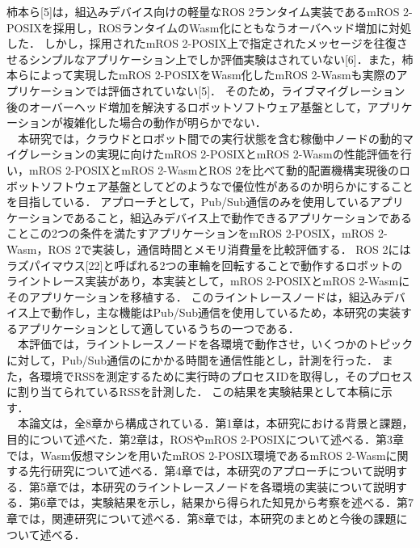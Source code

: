 柿本ら[5]は，組込みデバイス向けの軽量なROS 2ランタイム実装であるmROS 2-POSIXを採用し，ROSランタイムのWasm化にともなうオーバヘッド増加に対処した．
しかし，採用されたmROS 2-POSIX上で指定されたメッセージを往復させるシンプルなアプリケーション上でしか評価実験はされていない[6]．また，柿本らによって実現したmROS 2-POSIXをWasm化したmROS 2-Wasmも実際のアプリケーションでは評価されていない[5]．
そのため，ライブマイグレーション後のオーバーヘッド増加を解決するロボットソフトウェア基盤として，アプリケーションが複雑化した場合の動作が明らかでない．
\\　本研究では，クラウドとロボット間での実行状態を含む稼働中ノードの動的マイグレーションの実現に向けたmROS 2-POSIXとmROS 2-Wasmの性能評価を行い，mROS 2-POSIXとmROS 2-WasmとROS 2を比べて動的配置機構実現後のロボットソフトウェア基盤としてどのようなで優位性があるのか明らかにすることを目指している．
アプローチとして，Pub/Sub通信のみを使用しているアプリケーションであること，組込みデバイス上で動作できるアプリケーションであることこの2つの条件を満たすアプリケーションをmROS 2-POSIX，mROS 2-Wasm，ROS 2で実装し，通信時間とメモリ消費量を比較評価する．
ROS 2にはラズパイマウス[22]と呼ばれる2つの車輪を回転することで動作するロボットのライントレース実装があり，本実装として，mROS 2-POSIXとmROS 2-Wasmにそのアプリケーションを移植する．
このライントレースノードは，組込みデバイス上で動作し，主な機能はPub/Sub通信を使用しているため，本研究の実装するアプリケーションとして適しているうちの一つである．
\\　本評価では，ライントレースノードを各環境で動作させ，いくつかのトピックに対して，Pub/Sub通信のにかかる時間を通信性能とし，計測を行った．
また，各環境でRSSを測定するために実行時のプロセスIDを取得し，そのプロセスに割り当てられているRSSを計測した．
この結果を実験結果として本稿に示す．
\\　本論文は，全8章から構成されている．第1章は，本研究における背景と課題，目的について述べた．第2章は，ROSやmROS 2-POSIXについて述べる．第3章では，Wasm仮想マシンを用いたmROS 2-POSIX環境であるmROS 2-Wasmに関する先行研究について述べる．第4章では，本研究のアプローチについて説明する．第5章では，本研究のライントレースノードを各環境の実装について説明する．第6章では，実験結果を示し，結果から得られた知見から考察を述べる．第7章では，関連研究について述べる．第8章では，本研究のまとめと今後の課題について述べる．
